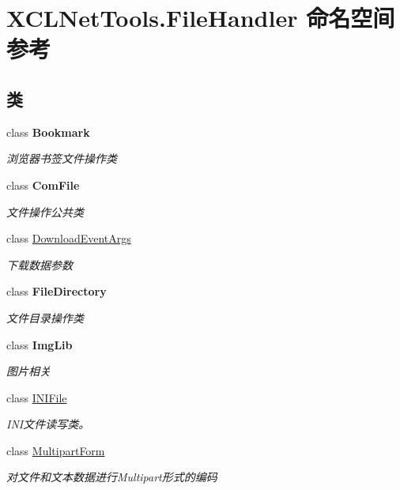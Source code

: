 \hypertarget{namespace_x_c_l_net_tools_1_1_file_handler}{}\section{X\+C\+L\+Net\+Tools.\+File\+Handler 命名空间参考}
\label{namespace_x_c_l_net_tools_1_1_file_handler}
\subsection*{类}
\begin{DoxyCompactItemize}
\item 
class {\bfseries Bookmark}
\begin{DoxyCompactList}\small\item\em 浏览器书签文件操作类 \end{DoxyCompactList}\item 
class {\bfseries Com\+File}
\begin{DoxyCompactList}\small\item\em 文件操作公共类 \end{DoxyCompactList}\item 
class \hyperlink{class_x_c_l_net_tools_1_1_file_handler_1_1_download_event_args}{Download\+Event\+Args}
\begin{DoxyCompactList}\small\item\em 下载数据参数 \end{DoxyCompactList}\item 
class {\bfseries File\+Directory}
\begin{DoxyCompactList}\small\item\em 文件目录操作类 \end{DoxyCompactList}\item 
class {\bfseries Img\+Lib}
\begin{DoxyCompactList}\small\item\em 图片相关 \end{DoxyCompactList}\item 
class \hyperlink{class_x_c_l_net_tools_1_1_file_handler_1_1_i_n_i_file}{I\+N\+I\+File}
\begin{DoxyCompactList}\small\item\em I\+N\+I文件读写类。 \end{DoxyCompactList}\item 
class \hyperlink{class_x_c_l_net_tools_1_1_file_handler_1_1_multipart_form}{Multipart\+Form}
\begin{DoxyCompactList}\small\item\em 对文件和文本数据进行\+Multipart形式的编码 \end{DoxyCompactList}\item 

\end{DoxyCompactItemize}
